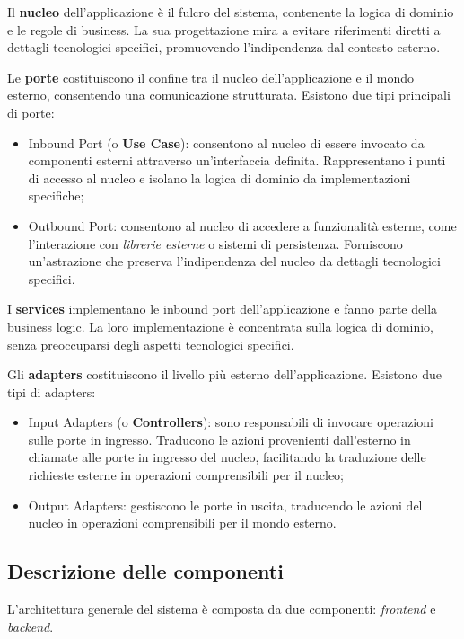 \documentclass[10pt, a4paper]{article}
\begin{document}
Il \textbf{nucleo} dell'applicazione è il fulcro del sistema, contenente la logica di dominio e le regole di business. La sua progettazione mira a evitare riferimenti diretti a dettagli tecnologici specifici, promuovendo l'indipendenza dal contesto esterno.

Le \textbf{porte} costituiscono il confine tra il nucleo dell'applicazione e il mondo esterno, consentendo una comunicazione strutturata. Esistono due tipi principali di porte:
\begin{itemize}
    \item Inbound Port (o \textbf{Use Case}): consentono al nucleo di essere invocato da componenti esterni attraverso un'interfaccia definita. Rappresentano i punti di accesso al nucleo e isolano la logica di dominio da implementazioni specifiche;
    \item Outbound Port: consentono al nucleo di accedere a funzionalità esterne, come l'interazione con \textit{librerie esterne\pg} o sistemi di persistenza. Forniscono un'astrazione che preserva l'indipendenza del nucleo da dettagli tecnologici specifici.  
\end{itemize}

I \textbf{services} implementano le inbound port dell'applicazione e fanno parte della business logic. La loro implementazione è concentrata sulla logica di dominio, senza preoccuparsi degli aspetti tecnologici specifici.

Gli \textbf{adapters} costituiscono il livello più esterno dell'applicazione. Esistono due tipi di adapters:
\begin{itemize}
    \item Input Adapters (o \textbf{Controllers}): sono responsabili di invocare operazioni sulle porte in ingresso. Traducono le azioni provenienti dall'esterno in chiamate alle porte in ingresso del nucleo, facilitando la traduzione delle richieste esterne in operazioni comprensibili per il nucleo;
    \item Output Adapters: gestiscono le porte in uscita, traducendo le azioni del nucleo in operazioni comprensibili per il mondo esterno.
\end{itemize}

\subsection{Descrizione delle componenti}
L'architettura generale del sistema è composta da due componenti: \textit{frontend\pg} e \textit{backend\pg}.
\end{document}
